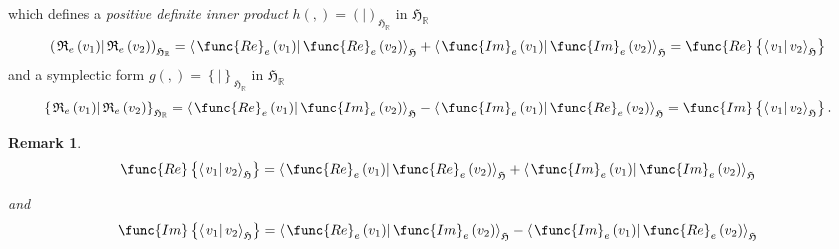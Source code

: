 \documentclass[aps,preprint]{revtex4}
\newtheorem{remark}[theorem]{Remark}
\begin{document}
\begin{enumerate}
which defines a \emph{positive definite inner product} $h\left( ,\right)
=\left( \left. {}\right\vert \right) _{\mathfrak{H}_{\mathbb{R}}}$ in $%
\mathfrak{H}_{\mathbb{R}}$ 
\begin{equation}
\left( \left. \mathfrak{R}_{e}\left( v_{1}\right) \right\vert \mathfrak{R}%
_{e}\left( v_{2}\right) \right) _{\mathfrak{H}_{\mathbb{R}}}=\left\langle
\left. \func{Re}_{e}\left( v_{1}\right) \right\vert \func{Re}_{e}\left(
v_{2}\right) \right\rangle _{\mathfrak{H}}+\left\langle \left. \func{Im}%
_{e}\left( v_{1}\right) \right\vert \func{Im}_{e}\left( v_{2}\right)
\right\rangle _{\mathfrak{H}}=\func{Re}\left\{ \left\langle \left.
v_{1}\right\vert v_{2}\right\rangle _{\mathfrak{H}}\right\}
\end{equation}%
and a symplectic form $g\left( ,\right) =\left\{ \left. {}\right\vert
\right\} _{\mathfrak{H}_{\mathbb{R}}}$ in $\mathfrak{H}_{\mathbb{R}}$%
\begin{equation}
\left\{ \left. \mathfrak{R}_{e}\left( v_{1}\right) \right\vert \mathfrak{R}%
_{e}\left( v_{2}\right) \right\} _{\mathfrak{H}_{\mathbb{R}}}=\left\langle
\left. \func{Re}_{e}\left( v_{1}\right) \right\vert \func{Im}_{e}\left(
v_{2}\right) \right\rangle _{\mathfrak{H}}-\left\langle \left. \func{Im}%
_{e}\left( v_{1}\right) \right\vert \func{Re}_{e}\left( v_{2}\right)
\right\rangle _{\mathfrak{H}}=\func{Im}\left\{ \left\langle \left.
v_{1}\right\vert v_{2}\right\rangle _{\mathfrak{H}}\right\} .
\end{equation}

\begin{remark}
\begin{equation}
\func{Re}\left\{ \left\langle \left. v_{1}\right\vert v_{2}\right\rangle _{%
\mathfrak{H}}\right\} =\left\langle \left. \func{Re}_{e}\left( v_{1}\right)
\right\vert \func{Re}_{e}\left( v_{2}\right) \right\rangle _{\mathfrak{H}%
}+\left\langle \left. \func{Im}_{e}\left( v_{1}\right) \right\vert \func{Im}%
_{e}\left( v_{2}\right) \right\rangle _{\mathfrak{H}}
\end{equation}

and 
\begin{equation}
\func{Im}\left\{ \left\langle \left. v_{1}\right\vert v_{2}\right\rangle _{%
\mathfrak{H}}\right\} =\left\langle \left. \func{Re}_{e}\left( v_{1}\right)
\right\vert \func{Im}_{e}\left( v_{2}\right) \right\rangle _{\mathfrak{H}%
}-\left\langle \left. \func{Im}_{e}\left( v_{1}\right) \right\vert \func{Re}%
_{e}\left( v_{2}\right) \right\rangle _{\mathfrak{H}}
\end{equation}


\end{remark}
\end{enumerate}
\end{document}

